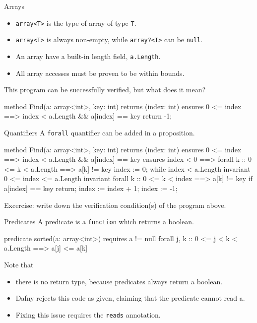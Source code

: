 \documentclass[10pt, compress]{beamer}
\begin{document}
\begin{frame}[fragile]{Arrays}
  \begin{itemize}
  \item \verb|array<T>| is the type of array of type \verb|T|.
  \item \verb|array<T>| is always non-empty, while \verb|array?<T>| can be \verb|null|.
  \item An array have a built-in length field, \verb|a.Length|.
  \item All array accesses must be proven to be within bounds.
  \end{itemize}
  This program can be successfully verified, but what does it mean?
  \begin{verbnobox}[\footnotesize]
method Find(a: array<int>, key: int) returns (index: int)
   ensures 0 <= index ==> index < a.Length && a[index] == key
{
  return -1;
}
  \end{verbnobox}
\end{frame}

\begin{frame}[fragile]{Quantifiers}
  A \verb|forall| quantifier can be added in a proposition.

  \begin{verbnobox}[\scriptsize]
method Find(a: array<int>, key: int) returns (index: int)
   ensures 0 <= index ==> index < a.Length && a[index] == key
   ensures index < 0 ==> forall k :: 0 <= k < a.Length ==> a[k] != key
{
   index := 0;
   while index < a.Length
      invariant 0 <= index <= a.Length
      invariant forall k :: 0 <= k < index ==> a[k] != key
   {
      if a[index] == key { return; }
      index := index + 1;
   }
   index := -1;
}
  \end{verbnobox}
  Excercise: write down the verification condition(s) of the program above.
\end{frame}

\begin{frame}[fragile]{Predicates}
  A predicate is a \verb|function| which returns a boolean. 
  \begin{verbnobox}[\footnotesize]
predicate sorted(a: array<int>)
   requires a != null
{
   forall j, k :: 0 <= j < k < a.Length ==> a[j] <= a[k]
}
  \end{verbnobox}
Note that
  \begin{itemize}
  \item there is no return type, because predicates always return a boolean.
  \item Dafny rejects this code as given, claiming that the predicate cannot read a.
  \item Fixing this issue requires the \verb|reads| annotation.
  \end{itemize}
\end{frame}
\end{document}
